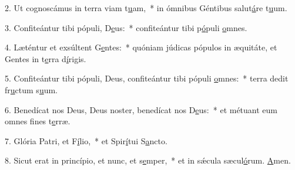2. Ut cognoscámus in terra viam t\uline{u}am,~* in ómnibus Géntibus salut\uline{á}re t\uline{u}um.\par 
3. Confiteántur tibi pópuli, D\uline{e}us:~* confiteántur tibi p\uline{ó}puli \uline{o}mnes.\par 
4. Læténtur et exsúltent G\uline{e}ntes:~* quóniam júdicas pópulos in æquitáte, et Gentes in t\uline{e}rra d\uline{í}rigis.\par 
5. Confiteántur tibi pópuli, Deus, confiteántur tibi pópuli \uline{o}mnes:~* terra dedit fr\uline{u}ctum s\uline{u}um.\par 
6. Benedícat nos Deus, Deus noster, benedícat nos D\uline{e}us:~* et métuant eum omnes f\uline{i}nes t\uline{e}rræ.\par 
7. Glória Patri, et F\uline{í}lio,~* et Spir\uline{í}tui S\uline{a}ncto.\par 
8. Sicut erat in princípio, et nunc, et s\uline{e}mper,~* et in sǽcula sæcul\uline{ó}rum. \uline{A}men.\par 
